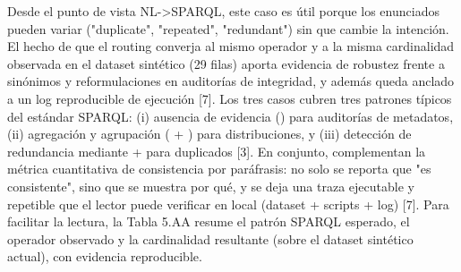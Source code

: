 {}Desde el punto de vista NL->SPARQL, este caso es útil porque los enunciados pueden variar ("duplicate", "repeated", "redundant") sin que cambie la intención. El hecho de que el routing converja al mismo operador y a la misma cardinalidad observada en el dataset sintético (29 filas) aporta evidencia de robustez frente a sinónimos y reformulaciones en auditorías de integridad, y además queda anclado a un log reproducible de ejecución [7].\markdownRendererInterblockSeparator
{} Los tres casos cubren tres patrones típicos del estándar SPARQL: (i) ausencia de evidencia () para auditorías de metadatos, (ii) agregación y agrupación ( + ) para distribuciones, y (iii) detección de redundancia mediante  +  para duplicados [3]. En conjunto, complementan la métrica cuantitativa de consistencia por paráfrasis: no solo se reporta que "es consistente", sino que se muestra por qué, y se deja una traza ejecutable y repetible que el lector puede verificar en local (dataset + scripts + log) [7].\markdownRendererInterblockSeparator
{}Para facilitar la lectura, la Tabla 5.AA resume el patrón SPARQL esperado, el operador observado y la cardinalidad resultante (sobre el dataset sintético actual), con evidencia reproducible.\markdownRendererInterblockSeparator
{}\markdownRendererInterblockSeparator
